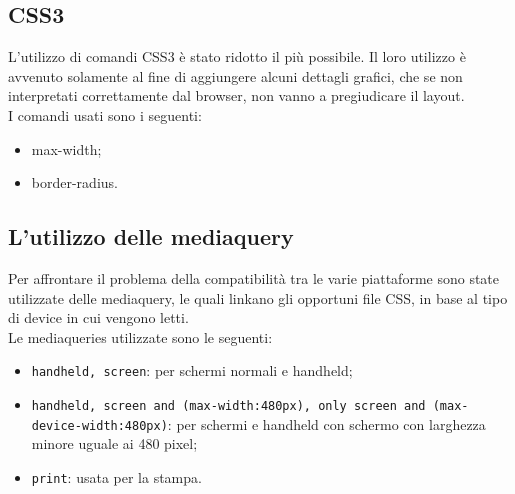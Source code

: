 \subsection{CSS3}
L'utilizzo di comandi CSS3 è stato ridotto il più possibile. Il loro utilizzo è avvenuto solamente al fine di aggiungere alcuni dettagli grafici, che se non interpretati correttamente dal browser, non vanno a pregiudicare il layout.\\
I comandi usati sono i seguenti:
\begin{itemize}
  \item max-width;
  \item border-radius.
\end{itemize}

\subsection{L'utilizzo delle mediaquery}

Per affrontare il problema della compatibilità tra le varie piattaforme sono state utilizzate delle mediaquery, le quali linkano gli opportuni file CSS, in base al tipo di device in cui vengono letti.\\
Le mediaqueries utilizzate sono le seguenti:
\begin{itemize}
	\item \texttt{handheld, screen}: per schermi normali e handheld;
	\item \texttt{handheld, screen and (max-width:480px), only screen and (max-device-width:480px)}: per schermi e handheld con schermo con larghezza minore uguale ai 480 pixel;
	\item \texttt{print}: usata per la stampa.
\end{itemize}

